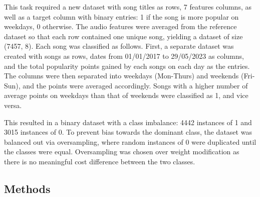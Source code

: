 \documentclass{article}
\begin{document}
This task required a new dataset with song titles as rows, 7 features columns, as well as a target column with binary entries: 1 if the song is more popular on weekdays, 0 otherwise. The audio features were averaged from the reference dataset so that each row contained one unique song, yielding a dataset of size (7457, 8). Each song was classified as follows. First, a separate dataset was created with songs as rows, dates from 01/01/2017 to 29/05/2023 as columns, and the total popularity points gained by each songs on each day as the entries. The columns were then separated into weekdays (Mon-Thurs) and weekends (Fri-Sun), and the points were averaged accordingly. Songs with a higher number of average points on weekdays than that of weekends were classified as 1, and vice versa.

This resulted in a binary dataset with a class imbalance: 4442 instances of 1 and 3015 instances of 0. To prevent bias towards the dominant class, the dataset was balanced out via oversampling, where random instances of 0 were duplicated until the classes were equal. Oversampling was chosen over weight modification as there is no meaningful cost difference between the two classes. 

\subsection{Methods}
\end{document}
